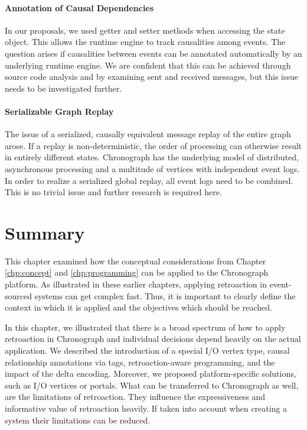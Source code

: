 \paragraph{Annotation of Causal Dependencies}
In our proposals, we used getter and setter methods when accessing the state
object. This allows the runtime engine to track causalities among events.
The question arises if causalities between events can be annotated automatically 
by an underlying runtime engine. 
We are confident that this can be achieved through source code analysis and by
examining sent and received messages, but this issue needs to be investigated 
further.

\paragraph{Serializable Graph Replay}
The issue of a serialized, causally equivalent message replay of the entire graph 
arose. If a replay is non-deterministic, the order of processing can otherwise 
result in entirely different states.
Chronograph has the underlying model of distributed, asynchronous processing and 
a multitude of vertices with independent event logs. In order to realize a 
serialized global replay, all event logs need to be combined. This is no trivial 
issue and further research is required here.

\section{Summary}
This chapter examined how the conceptual considerations from Chapter 
\ref{chp:concept} and \ref{chp:programming} can be applied to the Chronograph 
platform. As illustrated in these earlier chapters, applying retroaction in 
event-sourced systems can get complex fast. Thus, it is important to clearly 
define the context in which it is applied and the objectives which should be 
reached.

In this chapter, we illustrated that there is a broad spectrum of how to apply 
retroaction in Chronograph and individual decisions depend heavily on the actual 
application.
We described the introduction of a special I/O vertex type, causal relationship 
annotations via tags, retroaction-aware programming, and the impact of the delta 
encoding. Moreover, we proposed platform-specific solutions, such as I/O vertices 
or portals.
%
What can be transferred to Chronograph as well, are the limitations of retroaction. 
They influence the expressiveness and informative value of retroaction heavily. 
If taken into account when creating a system their limitations can be reduced.

